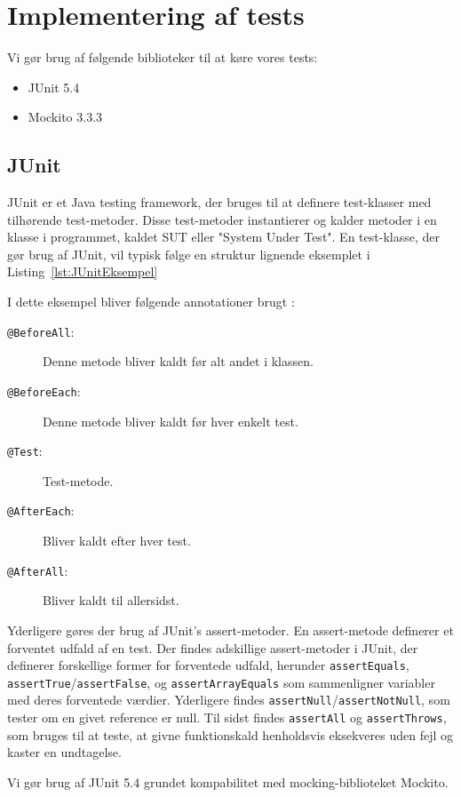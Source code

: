 \section{Implementering af tests}
Vi gør brug af følgende biblioteker til at køre vores tests:
\begin{itemize}
    \item JUnit 5.4
    \item Mockito 3.3.3
\end{itemize}

\subsection{JUnit}
JUnit \cite{JUnit} er et Java testing framework, der bruges til at definere test-klasser med tilhørende test-metoder. Disse test-metoder instantierer og kalder metoder i en klasse i programmet, kaldet SUT eller "System Under Test". En test-klasse, der gør brug af JUnit, vil typisk følge en struktur lignende eksemplet i Listing~\ref{lst:JUnitEksempel}

I dette eksempel bliver følgende annotationer brugt \cite{JUnitDocumentation}: 
\begin{description}
    \item[\texttt{@BeforeAll}:] Denne metode bliver kaldt før alt andet i klassen.
    \item[\texttt{@BeforeEach}:] Denne metode bliver kaldt før hver enkelt test.
    \item[\texttt{@Test}:] Test-metode.
    \item[\texttt{@AfterEach}:] Bliver kaldt efter hver test.
    \item[\texttt{@AfterAll}:] Bliver kaldt til allersidst.      
\end{description}

Yderligere gøres der brug af JUnit's assert-metoder. En assert-metode definerer et forventet udfald af en test. Der findes adskillige assert-metoder i JUnit, der definerer forskellige former for forventede udfald, herunder \texttt{assertEquals}, \texttt{assertTrue}/\texttt{assertFalse}, og \texttt{assertArrayEquals} som sammenligner variabler med deres forventede værdier. Yderligere findes \texttt{assertNull}/\texttt{assertNotNull}, som tester om en givet reference er null. Til sidst findes \texttt{assertAll} og \texttt{assertThrows}, som bruges til at teste, at givne funktionskald henholdsvis eksekveres uden fejl og kaster en undtagelse\cite{JUnitDocumentation}.

Vi gør brug af JUnit 5.4 grundet kompabilitet med mocking-biblioteket Mockito.

